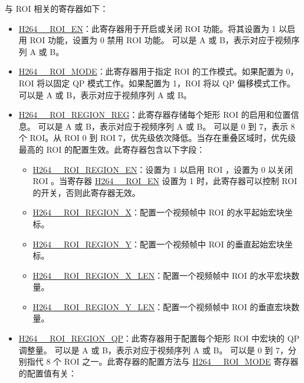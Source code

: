 \documentclass[main\_\_CN.tex]{subfiles}
\begin{document}
与 ROI 相关的寄存器如下：
\begin{itemize}
    \item \hyperref[fielddesc:H264AROIEN]{H264\_\_ROI\_EN}：此寄存器用于开启或关闭 ROI 功能。将其设置为 1 以启用 ROI 功能，设置为 0 禁用 ROI 功能。 可以是 A 或 B，表示对应于视频序列 A 或 B。
    \item \hyperref[fielddesc:H264AROIMODE]{H264\_\_ROI\_MODE}：此寄存器用于指定 ROI 的工作模式。如果配置为 0，ROI 将以固定 QP 模式工作。如果配置为 1，ROI 将以 QP 偏移模式工作。 可以是 A 或 B，表示对应于视频序列 A 或 B。
    \item \hyperref[regdesc:H264AROIREGION0REG]{H264\_\_ROI\_REGION\_REG}：此寄存器存储每个矩形 ROI 的启用和位置信息。 可以是 A 或 B，表示对应于视频序列 A 或 B。 可以是 0 到 7，表示 8 个 ROI。从 ROI 0 到 ROI 7，优先级依次降低。当存在重叠区域时，优先级最高的 ROI 的配置生效。此寄存器包含以下字段：
        \begin{itemize}
            \item \hyperref[fielddesc:H264AROIREGION0EN]{H264\_\_ROI\_REGION\_EN}：设置为 1 以启用 ROI ，设置为 0 以关闭 ROI 。当寄存器 \hyperref[fielddesc:H264AROIEN]{H264\_\_ROI\_EN} 设置为 1 时，此寄存器可以控制 ROI  的开关，否则此寄存器无效。
            \item \hyperref[fielddesc:H264AROIREGION0X]{H264\_\_ROI\_REGION\_X}：配置一个视频帧中 ROI  的水平起始宏块坐标。
            \item \hyperref[fielddesc:H264AROIREGION0Y]{H264\_\_ROI\_REGION\_Y}：配置一个视频帧中 ROI  的垂直起始宏块坐标。
            \item \hyperref[fielddesc:H264AROIREGION0XLEN]{H264\_\_ROI\_REGION\_X\_LEN}：配置一个视频帧中 ROI  的水平宏块数量。
            \item \hyperref[fielddesc:H264AROIREGION0YLEN]{H264\_\_ROI\_REGION\_Y\_LEN}：配置一个视频帧中 ROI  的垂直宏块数量。
        \end{itemize}
    \item \hyperref[fielddesc:H264AROIREGION0QP]{H264\_\_ROI\_REGION\_QP}：此寄存器用于配置每个矩形 ROI 中宏块的 QP 调整量。 可以是 A 或 B，表示对应于视频序列 A 或 B。 可以是 0 到 7，分别指代 8 个 ROI 之一。此寄存器的配置方法与 \hyperref[fielddesc:H264AROIMODE]{H264\_\_ROI\_MODE} 寄存器的配置值有关：

\end{itemize}
\end{document}
